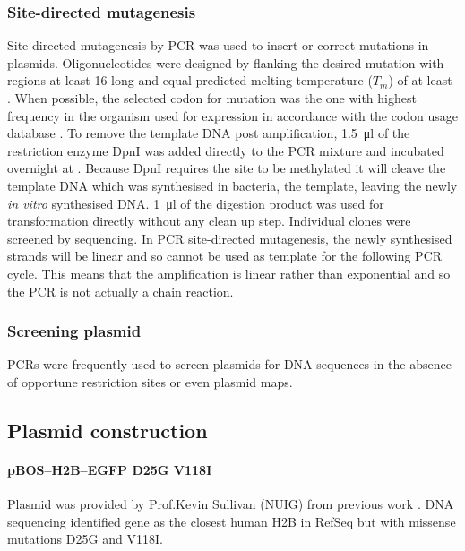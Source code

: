       \subsubsection{Site-directed mutagenesis}
        Site-directed mutagenesis by PCR was used to insert or correct
        mutations in plasmids.
        Oligonucleotides were designed by flanking the
        desired mutation with regions at least \SI{16}{\bp} long
        and equal predicted melting temperature ($T_m$) of at least .
        When possible, the selected codon for mutation was the one
        with highest frequency in the organism used for expression
        in accordance with the
        codon usage database \citep{codon_usage}.
        To remove the template DNA post amplification, \SI{1.5}{\ul} of the
        restriction enzyme DpnI was added directly to the PCR mixture
        and incubated overnight at .
        Because DpnI requires the site to be methylated it
        will cleave the template DNA which was synthesised in
        bacteria, the template, leaving the newly \textit{in vitro}
        synthesised DNA.
        \SI{1}{\ul} of the digestion product was used for
        transformation directly without any clean up step.
        Individual clones were screened by sequencing.
        In PCR site-directed mutagenesis, the newly synthesised
        strands will be linear and so cannot be used as template for
        the following PCR cycle.
        This means that the amplification is linear rather than
        exponential and so the PCR is not actually a chain reaction.

      \subsubsection{Screening plasmid}
        PCRs were frequently used to screen plasmids for DNA sequences
        in the absence of opportune restriction sites or even plasmid maps.

    \subsection{Plasmid construction}

      \paragraph{pBOS--H2B--EGFP D25G V118I}
      Plasmid was provided by Prof.\@ Kevin Sullivan (NUIG) from
      previous work \citep{KevinH2BGFP}.  DNA sequencing identified
      gene  as the closest human H2B in RefSeq but
      with missense mutations D25G and V118I.

